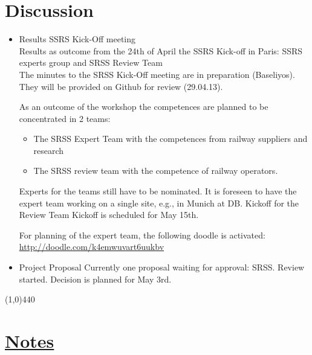 \documentclass[a4paper, 11pt]{article}
\begin{document}
\section{Discussion}
\begin{itemize}
\item Results SSRS Kick-Off meeting\\
Results as outcome from the 24th of April the SSRS Kick-off in Paris:
SSRS experts group and SRSS Review Team\\

The minutes to the SRSS Kick-Off meeting are in preparation (Baseliyos). They will be provided on Github for review (29.04.13). 

As an outcome of the workshop the competences are planned to be concentrated in 2 teams:
\begin{itemize}
\item The SRSS Expert Team with the competences from railway suppliers and research 
\item The SRSS review team with the competence of railway operators.
\end {itemize}
Experts for the teams still have to be nominated. It is foreseen to have the expert team working on a single site, e.g., in Munich at DB. Kickoff for the Review Team Kickoff is scheduled for May 15th.

For planning of the expert team, the following doodle is activated:\\
\url{http://doodle.com/k4emwuvart6uukbv}


\item Project Proposal
Currently one proposal waiting for approval: SRSS. Review started. Decision is planned for May 3rd.

\end{itemize}

\line(1,0){440}
\section{\underline{Notes}}
\end{document}
